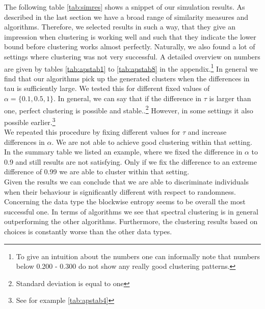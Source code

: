 \documentclass[12pt,a4paper,bibliography=totocnumbered,listof=totocnumbered]{scrartcl}
\begin{document}
The following table \ref{tab:simres}  shows a snippet of our simulation results. As described in the last section we have a broad range of similarity measures and algorithms. Therefore, we selected results in such a way, that they give an impression when clustering is working well and such that they indicate the lower bound before clustering works almost perfectly. Naturally, we also found a lot of settings where clustering was not very successful. A detailed overview on numbers are given by tables \ref{tab:apstab1} to \ref{tab:apstab8} in the appendix.\footnote{To give an intuition about the numbers one can informally note that numbers below 0.200 - 0.300 do not show any really good clustering patterns.}
In general we find that our algorithms pick up the generated clusters when the differences in tau is sufficiently large. We tested this for different fixed values of $\alpha=\{0.1,0.5,1\}$. In general, we can say that if the difference in $\tau$ is larger than one, perfect clustering is possible and stable..\footnote{Standard deviation is equal to one} However, in some settings it also possible earlier.\footnote{See for example \ref{tab:apstab4} } \\
We repeated this procedure by fixing different values for $\tau$ and increase differences in $\alpha$. We are not able to achieve good clustering within that setting. In the summary table we listed an example, where we fixed the difference in $\alpha$ to 0.9 and still results are not satisfying. Only if we fix the difference to an extreme difference of 0.99 we are able to cluster within that setting.\\
Given the results we can conclude that we are able to discriminate individuals when their behaviour is significantly different with respect to randomness.\\
Concerning the data type the blockwise entropy seems to be overall the most successful one. In terms of algorithms we see that spectral clustering is in general outperforming the other algorithms. Furthermore, the clustering results based on choices is constantly worse than the other data types.

\pagebreak
\end{document}
